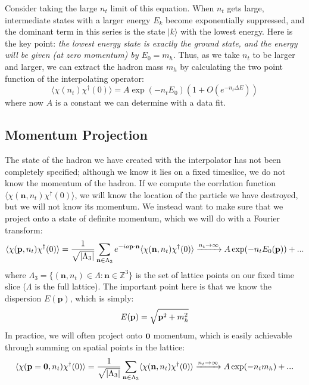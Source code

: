 \documentclass[11pt, oneside]{article}   	%
\theoremstyle{definition}
\begin{document}
Consider taking the large $n_t$ limit of this equation. When $n_t$ gets large, intermediate states with a larger 
energy $E_k$ become exponentially suppressed, and the dominant term in this series is the state $|k\rangle$ 
with the lowest energy. Here is the key point: \textit{the lowest energy state is exactly the ground state, and the 
energy will be given (at zero momentum) by $E_0 = m_h$}. Thus, as we take $n_t$ to be larger and larger, 
we can extract the hadron mass $m_h$ by calculating the two point function of the interpolating operator:
\begin{equation}
	\langle\chi(n_t)\chi^\dagger(0)\rangle = A\exp(-n_t E_0)(1 + O(e^{-n_t\Delta E}))
\end{equation}
where now $A$ is a constant we can determine with a data fit. 

\subsection{Momentum Projection}

The state of the hadron we have created with the interpolator has not been completely specified; although we know 
it lies on a fixed timeslice, we do not know the momentum of the hadron. If we compute the corrlation function 
$\langle\chi(\textbf{n}, n_t)\chi^\dagger (0)\rangle$, we will know the location of the particle we have destroyed, 
but we will not know its momentum. We instead want to make sure that we project onto a state of definite 
momentum, which we will do with a Fourier transform:
\begin{equation}
	\langle\chi(\textbf p, n_t)\chi^\dagger(0)\rangle = \frac{1}{\sqrt{|\Lambda_3|}}\sum_{\textbf n\in\Lambda_3}e^{-ia
	\textbf{p}\cdot\textbf{n}}\langle\chi(\textbf n, n_t)\chi^\dagger(0)\rangle \xrightarrow{n_t\rightarrow\infty} 
	A\exp(-n_t E_0(\textbf p)) + ...
\end{equation}
where $\Lambda_3 = \{(\textbf{n}, n_t)\in\Lambda : \mathbf{n}\in\mathbb Z^3\}$ is the set of lattice points on our 
fixed time slice ($\Lambda$ is the full lattice). The important point here is that we know the dispersion $E(\mathbf p)$, 
which is simply:
\begin{equation}
	E(\mathbf p) = \sqrt{\textbf p^2 + m_h^2}
\end{equation}
In practice, we will often project onto $\textbf 0$ momentum, which is easily achievable through summing on spatial 
points in the lattice:
\begin{equation}
	\langle \chi(\textbf p = \textbf 0, n_t)\chi^\dagger(0)\rangle = \frac{1}{\sqrt{|\Lambda_3|}}\sum_{\textbf{n}
	\in\Lambda_3}\langle\chi(\textbf n, n_t)\chi^\dagger(0)\rangle\xrightarrow{n_t\rightarrow\infty} A\exp(-n_t m_h) + ...
\end{equation}
\end{document}
